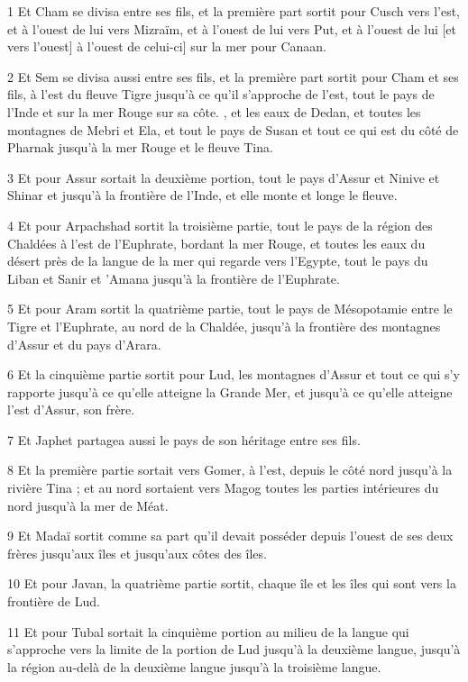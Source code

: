 \par 1 Et Cham se divisa entre ses fils, et la première part sortit pour Cusch vers l'est, et à l'ouest de lui vers Mizraïm, et à l'ouest de lui vers Put, et à l'ouest de lui [et vers l'ouest] à l'ouest de celui-ci] sur la mer pour Canaan.
\par 2 Et Sem se divisa aussi entre ses fils, et la première part sortit pour Cham et ses fils, à l'est du fleuve Tigre jusqu'à ce qu'il s'approche de l'est, tout le pays de l'Inde et sur la mer Rouge sur sa côte. , et les eaux de Dedan, et toutes les montagnes de Mebri et Ela, et tout le pays de Susan et tout ce qui est du côté de Pharnak jusqu'à la mer Rouge et le fleuve Tina.
\par 3 Et pour Assur sortait la deuxième portion, tout le pays d'Assur et Ninive et Shinar et jusqu'à la frontière de l'Inde, et elle monte et longe le fleuve.
\par 4 Et pour Arpachshad sortit la troisième partie, tout le pays de la région des Chaldées à l'est de l'Euphrate, bordant la mer Rouge, et toutes les eaux du désert près de la langue de la mer qui regarde vers l'Egypte, tout le pays du Liban et Sanir et 'Amana jusqu'à la frontière de l'Euphrate.
\par 5 Et pour Aram sortit la quatrième partie, tout le pays de Mésopotamie entre le Tigre et l'Euphrate, au nord de la Chaldée, jusqu'à la frontière des montagnes d'Assur et du pays d'Arara.
\par 6 Et la cinquième partie sortit pour Lud, les montagnes d'Assur et tout ce qui s'y rapporte jusqu'à ce qu'elle atteigne la Grande Mer, et jusqu'à ce qu'elle atteigne l'est d'Assur, son frère.
\par 7 Et Japhet partagea aussi le pays de son héritage entre ses fils.
\par 8 Et la première partie sortait vers Gomer, à l'est, depuis le côté nord jusqu'à la rivière Tina ; et au nord sortaient vers Magog toutes les parties intérieures du nord jusqu'à la mer de Méat.
\par 9 Et Madaï sortit comme sa part qu'il devait posséder depuis l'ouest de ses deux frères jusqu'aux îles et jusqu'aux côtes des îles.
\par 10 Et pour Javan, la quatrième partie sortit, chaque île et les îles qui sont vers la frontière de Lud.
\par 11 Et pour Tubal sortait la cinquième portion au milieu de la langue qui s'approche vers la limite de la portion de Lud jusqu'à la deuxième langue, jusqu'à la région au-delà de la deuxième langue jusqu'à la troisième langue.
